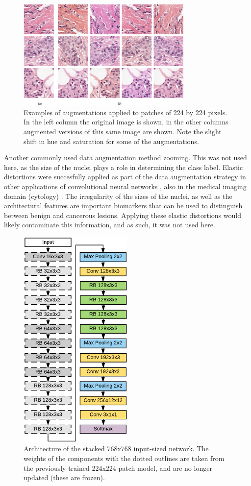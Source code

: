 \documentclass[journal]{IEEEtran}
\begin{document}
\begin{figure}[!t]
\centering{}
\includegraphics[width=3.4in]{augment_examples}
\caption{Examples of augmentations applied to patches of 224 by 224 pixels. In the left column the original image is shown, in the other columns augmented versions of this same image are shown. Note the slight shift in hue and saturation for some of the augmentations.}
\label{fig_augment}
\end{figure}


\medskip

Another commonly used data augmentation method zooming. This was not used here, as the size of the nuclei plays a role in determining the class label. Elastic distortions were succesfully applied as part of the data augmentation strategy in other applications of convolutional neural networks \cite{elastransforms}, also in the medical imaging domain (cytology) \cite{unet}. The irregularity of the sizes of the nuclei, as well as the architectural features are important biomarkers that can be used to distinguish between benign and cancerous lesions. Applying these elastic distortions would likely contaminate this information, and as such, it was not used here.


\begin{figure}[!t]
\centering{}
\includegraphics[width=2.2in]{architecture_stacked}
\vspace{-0.15cm}\caption{Architecture of the stacked 768x768 input-sized network. The weights of the components with the dotted outlines are taken from the previously trained 224x224 patch model, and are no longer updated (these are frozen).}
\label{fig_stacked}
\end{figure}
\end{document}
